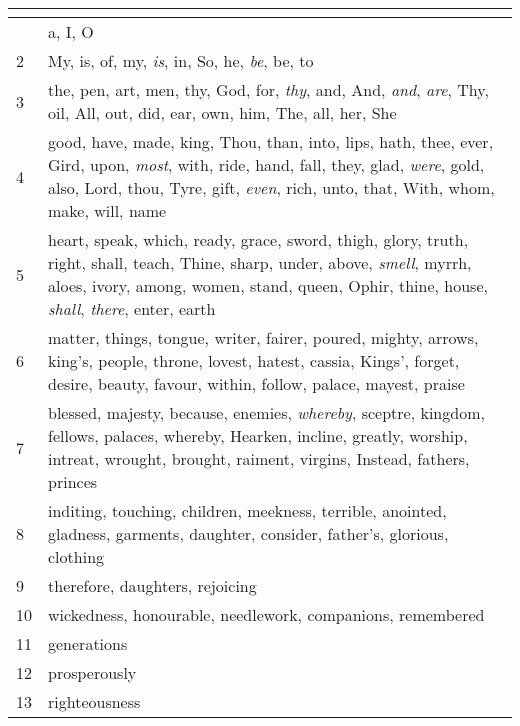 \begin{center}
\begin{longtable}{l|p{3.75in}}
\hline \multicolumn{2}{c}{{ }} \\ \hline
\endfoot 
1 & a, I, O\\ \hline 
2 & My, is, of, my, \emph{is}, in, So, he, \emph{be}, be, to\\ \hline 
3 & the, pen, art, men, thy, God, for, \emph{thy}, and, And, \emph{and}, \emph{are}, Thy, oil, All, out, did, ear, own, him, The, all, her, She\\ \hline 
4 & good, have, made, king, Thou, than, into, lips, hath, thee, ever, Gird, upon, \emph{most}, with, ride, hand, fall, they, glad, \emph{were}, gold, also, Lord, thou, Tyre, gift, \emph{even}, rich, unto, that, With, whom, make, will, name\\ \hline 
5 & heart, speak, which, ready, grace, sword, thigh, glory, truth, right, shall, teach, Thine, sharp, under, above, \emph{smell}, myrrh, aloes, ivory, among, women, stand, queen, Ophir, thine, house, \emph{shall}, \emph{there}, enter, earth\\ \hline 
6 & matter, things, tongue, writer, fairer, poured, mighty, arrows, king's, people, throne, lovest, hatest, cassia, Kings', forget, desire, beauty, favour, within, follow, palace, mayest, praise\\ \hline 
7 & blessed, majesty, because, enemies, \emph{whereby}, sceptre, kingdom, fellows, palaces, whereby, Hearken, incline, greatly, worship, intreat, wrought, brought, raiment, virgins, Instead, fathers, princes\\ \hline 
8 & inditing, touching, children, meekness, terrible, anointed, gladness, garments, daughter, consider, father's, glorious, clothing\\ \hline 
9 & therefore, daughters, rejoicing\\ \hline 
10 & wickedness, honourable, needlework, companions, remembered\\ \hline 
11 & generations\\ \hline 
12 & prosperously\\ \hline 
13 & righteousness\\ \hline 
\end{longtable}
\end{center}






